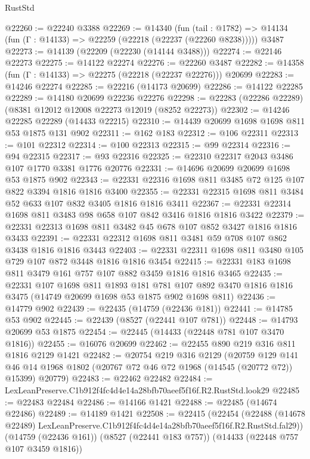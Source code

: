\begin{lexlean}{RustStd}
\begin{coremodule}
@22260 := @22240 @3388
@22269 := @14340
    (fun (tail : @1782) => @14134 (fun (Γ : @14133) => @22259 (@22218 (@22237 (@22260 @8238)))))
    @3487
@22273 := @14139 (@22209 (@22230 (@14144 @3488)))
@22274 := @22146 @22273
@22275 := @14122 @22274
@22276 := @22260 @3487
@22282 := @14358 (fun (Γ : @14133) => @22275 (@22218 (@22237 @22276))) @20699
@22283 := @14246 @22274
@22285 := @22216 (@14173 @20699)
@22286 := @14122 @22285
@22289 := @14180 @20699 @22236 @22276
@22298 := @22283 (@22286 @22289) (@8381 @12012 @12008 @22273 @12019 (@8252 @22273))
@22302 := @14246 @22285 @22289 (@14433 @22215)
@22310 := @14439 @20699 @1698 @1698 @811 @53 @1875 @131 @902
@22311 := @162 @183
@22312 := @106 @22311
@22313 := @101 @22312
@22314 := @100 @22313
@22315 := @99 @22314
@22316 := @94 @22315
@22317 := @93 @22316
@22325 := @22310 @22317 @2043 @3486 @107 @1770 @3381 @1776 @20776
@22331 := @14696 @20699 @20699 @1698 @53 @1875 @902
@22343 := @22331 @22316 @1698 @811 @3485 @72 @125 @107 @822 @3394 @1816 @1816 @3400
@22355 := @22331 @22315 @1698 @811 @3484 @52 @633 @107 @832 @3405 @1816 @1816 @3411
@22367 := @22331 @22314 @1698 @811 @3483 @98 @658 @107 @842 @3416 @1816 @1816 @3422
@22379 := @22331 @22313 @1698 @811 @3482 @45 @678 @107 @852 @3427 @1816 @1816 @3433
@22391 := @22331 @22312 @1698 @811 @3481 @59 @708 @107 @862 @3438 @1816 @1816 @3443
@22403 := @22331 @22311 @1698 @811 @3480 @105 @729 @107 @872 @3448 @1816 @1816 @3454
@22415 := @22331 @183 @1698 @811 @3479 @161 @757 @107 @882 @3459 @1816 @1816 @3465
@22435 := @22331
    @107
    @1698
    @811
    @1893
    @181
    @781
    @107
    @892
    @3470
    @1816
    @1816
    @3475
    (@14749 @20699 @1698 @53 @1875 @902 @1698 @811)
@22436 := @14779 @902
@22439 := @22435 (@14759 (@22436 @181))
@22441 := @14785 @53 @902
@22445 := @22439 (@8527 (@22441 @107 @781))
@22448 := @14793 @20699 @53 @1875
@22454 := @22445 (@14433 (@22448 @781 @107 @3470 @1816))
@22455 := @16076 @20699
@22462 := @22455 @890 @219 @316 @811 @1816 @2129 @1421
@22482 := @20754
    @219
    @316
    @2129
    (@20759
      @129
      @141
      @46
      @14
      @1968
      @1802
      (@20767 @72 @46 @72 @1968 (@14545 (@20772 @72)) @15399)
      @20779)
@22483 := @22462 @22482
@22484 := LexLeanPreserve.C1b912f4fc4d4e14a28bfb70aeef5f16f.R2.RustStd.look29
@22485 := @22483 @22484
@22486 := @14166 @1421
@22488 := @22485 (@14674 @22486)
@22489 := @14189 @1421
@22508 := @22415
    (@22454
      (@22488 (@14678 @22489) LexLeanPreserve.C1b912f4fc4d4e14a28bfb70aeef5f16f.R2.RustStd.fal29))
    (@14759 (@22436 @161))
    (@8527 (@22441 @183 @757))
    (@14433 (@22448 @757 @107 @3459 @1816))

\end{coremodule}
\end{lexlean}
